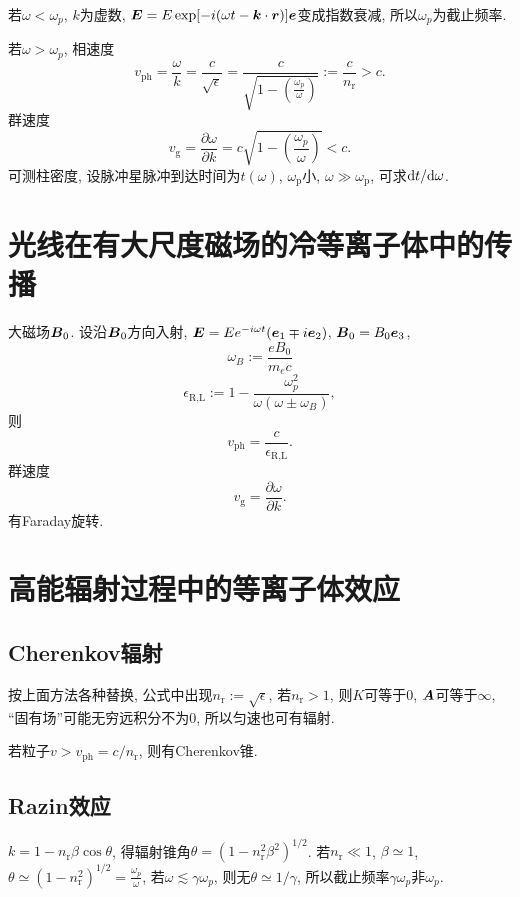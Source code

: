 若$\omega<\omega_p$, $k$为虚数, $\boldsymbol{E}=E\exp[-i(\omega t-\boldsymbol{k}\cdot\boldsymbol{r})]\boldsymbol{e}$变成指数衰减, 所以$\omega_p$为截止频率.

若$\omega>\omega_p$, 相速度
\begin{equation}
    v_\text{ph}=\frac{\omega}{k}=\frac{c}{\sqrt{\epsilon}}=\frac{c}{\sqrt{1-\left(\frac{\omega_p}{\omega}\right)}}:=\frac{c}{n_\text{r}}>c.
\end{equation}
群速度
\begin{equation}
    v_\text{g}=\frac{\partial\omega}{\partial k}=c\sqrt{1-\left(\frac{\omega_p}{\omega}\right)}<c.
\end{equation}
可测柱密度, 设脉冲星脉冲到达时间为$t(\omega)$, $\omega_\text{p}$小, $\omega\gg\omega_\text{p}$, 可求$\mathrm{d} t/\mathrm{d}\omega$.

\section{光线在有大尺度磁场的冷等离子体中的传播}

大磁场$\boldsymbol{B}_0$. 设沿$\boldsymbol{B}_0$方向入射, $\boldsymbol{E}=Ee^{-i\omega t}(\boldsymbol{e}_1\mp i\boldsymbol{e}_2)$, $\boldsymbol{B}_0=B_0\boldsymbol{e}_3$,
\begin{equation}
    \omega_B:=\frac{eB_0}{m_ec}
\end{equation}
\begin{equation}
    \epsilon_\text{R,L}:=1-\frac{\omega_p^2}{\omega(\omega\pm\omega_B)},
\end{equation}
则
\begin{equation}
    v_\text{ph}=\frac{c}{\epsilon_\text{R,L}}.
\end{equation}
群速度
\begin{equation}
    v_\text{g}=\frac{\partial\omega}{\partial k}.
\end{equation}
有Faraday旋转.

\section{高能辐射过程中的等离子体效应}

\subsection{Cherenkov辐射}
按上面方法各种替换, 公式中出现$n_\text{r}:=\sqrt{\epsilon}$, 若$n_\text{r}>1$, 则$K$可等于$0$, $\boldsymbol{A}$可等于$\infty$, ``固有场''可能无穷远积分不为$0$, 所以匀速也可有辐射.

若粒子$v>v_\text{ph}=c/n_\text{r}$, 则有Cherenkov锥.

\subsection{Razin效应}

$k=1-n_\text{r}\beta\cos\theta$, 得辐射锥角$\theta=(1-n_\text{r}^2\beta^2)^{1/2}$. 若$n_\text{r}\ll1$, $\beta\simeq1$, $\theta\simeq(1-n_\text{r}^2)^{1/2}=\frac{\omega_p}{\omega}$, 若$\omega\lesssim\gamma\omega_p$, 则无$\theta\simeq1/\gamma$, 所以截止频率$\gamma\omega_p$非$\omega_p$.
